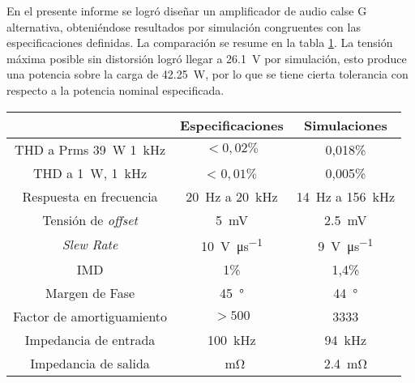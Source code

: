 




	En el presente informe se logró diseñar un amplificador de audio calse G alternativa, obteniéndose resultados por simulación congruentes con las especificaciones definidas. La comparación se resume en la tabla \ref{tab.resultados}. La tensión máxima posible sin distorsión logró llegar a \SI{26.1}{\volt} por simulación, esto produce una potencia sobre la carga de \SI{42.25}{\watt}, por lo que se tiene cierta tolerancia con respecto a la potencia nominal especificada.


\begin{table}
	\centering
	\begin{tabular}{ccc}
		\toprule
		& Especificaciones & Simulaciones \\
		\midrule
		 THD a Prms \SI{39}{\watt} \SI{1}{\kilo\hertz}& $< 0,02\%$ &  0,018\% \\
		 THD a \SI{1}{\watt}, \SI{1}{\kilo\hertz} & < $0,01\%$ & 0,005\% \\
		 Respuesta en frecuencia & \SI{20}{\hertz} a \SI{20}{\kilo\hertz} & \SI{14}{\hertz} a \SI{156}{\kilo\hertz} \\
		 Tensión de \textit{offset} & \SI{5}{\milli\volt} & \SI{2.5}{\milli\volt} \\
		 \textit{Slew Rate} & \SI{10}{\volt\per\micro\second} &  \SI{9}{\volt\per\micro\second} \\
		 IMD & 1\% & 1,4\% \\
		 Margen de Fase & \SI{45}{\degree} &  \SI{44}{\degree} \\
		 Factor de amortiguamiento & $>500$ & 3333 \\
		 Impedancia de entrada & \SI{100}{\kilo\hertz} & \SI{94}{\kilo\hertz} \\
		 Impedancia de salida & \SI{}{\milli\ohm} & \SI{2.4}{\milli\ohm}\\
		 \bottomrule
	\end{tabular}
	\label{tab.resultados}
\end{table}
